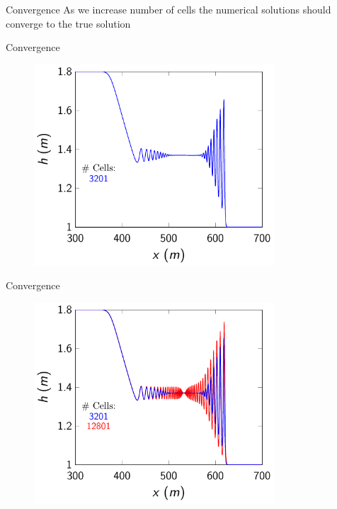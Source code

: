 \documentclass[]{beamer}
\begin{document}
\begin{frame}{Convergence}
As we increase number of cells the numerical solutions should converge to the true solution
\end{frame}
\begin{frame}{Convergence}
		\begin{figure}
			\includegraphics[width=0.8\textwidth]{./Pics/SteepGradients/h0.pdf}
		\end{figure}
\end{frame}
\begin{frame}{Convergence}
		\begin{figure}
			\includegraphics[width=0.8\textwidth]{./Pics/SteepGradients/h01.pdf}
		\end{figure}
\end{frame}
\end{document}
